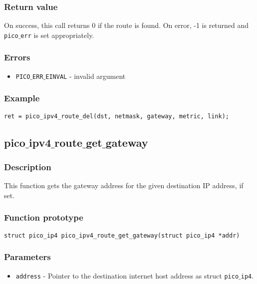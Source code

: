 \subsubsection*{Return value}
On success, this call returns 0 if the route is found.
On error, -1 is returned and \texttt{pico$\_$err} is set appropriately.

\subsubsection*{Errors}
\begin{itemize}[noitemsep]
\item \texttt{PICO$\_$ERR$\_$EINVAL} - invalid argument
\end{itemize}

\subsubsection*{Example}
\begin{verbatim}
ret = pico_ipv4_route_del(dst, netmask, gateway, metric, link);
\end{verbatim}



\subsection{pico$\_$ipv4$\_$route$\_$get$\_$gateway}

\subsubsection*{Description}
This function gets the gateway address for the given destination IP address, if set.

\subsubsection*{Function prototype}
\begin{verbatim}
struct pico_ip4 pico_ipv4_route_get_gateway(struct pico_ip4 *addr)
\end{verbatim}

\subsubsection*{Parameters}
\begin{itemize}[noitemsep]
\item \texttt{address} - Pointer to the destination internet host address as struct \texttt{pico$\_$ip4}.
\end{itemize}

